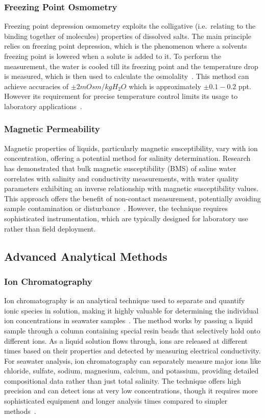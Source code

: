 \subsubsection{Freezing Point Osmometry}
Freezing point depression osmometry exploits the colligative (i.e.~relating to the binding together of molecules) properties of dissolved salts.
The main principle relies on freezing point depression, which is the phenomenon where a solvents freezing point is lowered when a solute is added to it.
To perform the measurement, the water is cooled till its freezing point and the temperature drop is measured, which is then used to calculate the osmolality~\cite{freeze_abele}.
This method can achieve accuracies of $\pm2 mOsm/kg H_{2}O$ which is approximately $\pm0.1-0.2$ \gls{ppt}. However its requirement for precise temperature control limits its usage to laboratory applications~\cite{freezing_accuracy}.


\subsubsection{Magnetic Permeability}
Magnetic properties of liquids, particularly magnetic susceptibility, vary with ion concentration, offering a potential method for salinity determination.
Research has demonstrated that bulk magnetic susceptibility (BMS) of saline water correlates with salinity and conductivity measurements, with water quality parameters exhibiting an inverse relationship with magnetic susceptibility values.
This approach offers the benefit of non-contact measurement, potentially avoiding sample contamination or disturbance~\cite{rana_magnetic_2021}.
However, the technique requires sophisticated instrumentation, which are typically designed for laboratory use rather than field deployment. 



\subsection{Advanced Analytical Methods}
\subsubsection{Ion Chromatography}
Ion chromatography is an analytical technique used to separate and quantify ionic species in solution, making it highly valuable for determining the individual ion concentrations in seawater samples~\cite{ion_chromatography}.
The method works by passing a liquid sample through a column containing special resin beads that selectively hold onto different ions.
As a liquid solution flows through, ions are released at different times based on their properties and detected by measuring electrical conductivity.
For seawater analysis, ion chromatography can separately measure major ions like chloride, sulfate, sodium, magnesium, calcium, and potassium, providing detailed compositional data rather than just total salinity. 
The technique offers high precision and can detect ions at very low concentrations, though it requires more sophisticated equipment and longer analysis times compared to simpler methods~\cite{gros_ionic_2008}.

